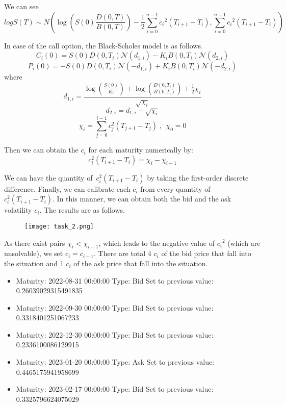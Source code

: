 We can see
\[log S(T) \sim N \left(\log \left( S(0)\frac{D(0,T)}{B(0,T)}\right)-\frac{1}{2}\sum_{i=0}^{n-1} {c_i}^2(T_{i+1}-T_{i}),\sum_{i=0}^{n-1} {c_i}^2(T_{i+1}-T_{i})\right)\]

In case of the call option, the Black-Scholes model is as follows.
\[C_i(0)=S(0)D(0,T_i)\mathcal{N}(d_{1,i})-K_iB(0,T_i)\mathcal{N}(d_{2,i})\]
\[P_i(0)=-S(0)D(0,T_i)\mathcal{N}(-d_{1,i})+K_iB(0,T_i)\mathcal{N}(-d_{2,i})\]
\vspace{1ex}
where \[ d_{1,i}=\frac{\log(\frac{S(0)}{K_i})+\log(\frac{D(0,T_i)}{B(0,T_i)})+\frac{1}{2}\chi_i}{\sqrt{\chi_i}}
\]
\[d_{2,i}=d_{1,i}-\sqrt{\chi_i}\]
\[\chi_i=\sum_{j=0}^{i-1}c_j^2(T_{j+1}-T_{j}) \;\text{, }\; \chi_0=0\]

Then we can obtain the \(c_i\) for each maturity numerically by:
\[c_i^2(T_{i+1}-T_{i})=\chi_i-\chi_{i-1}\]

We can have the quantity of\
\(c_i^2(T_{i+1}-T_{i})\) by taking the first-order discrete difference.
Finally, we can calibrate each \(c_i\) from every quantity of
\(c_i^2(T_{i+1}-T_{i})\). In this manner, we can obtain both the bid and the ask volatility \(c_i\).
\vspace{1ex}
The results are as follows.
\begin{figure}[h]
    \centering
    \texttt{[image: task\_2.png]}
\end{figure}

As there exist pairs \(\chi_i<\chi_{i-1}\), which leads to the negative value of \({c_i}^2\) (which are unsolvable), we set \(c_i=c_{i-1}\). There are total 4 \(c_i\) of the bid price that fall into the situation and 1 \(c_i\) of the ask price that fall into the situation.

\begin{itemize}
    \item Maturity: 2022-08-31 00:00:00 Type: Bid Set to previous value:  0.26039029315491835
    \item Maturity: 2022-09-30 00:00:00 Type: Bid Set to previous value:  0.3318401251067233
    \item Maturity: 2022-12-30 00:00:00 Type: Bid Set to previous value:  0.2336100086129915
    \item Maturity: 2023-01-20 00:00:00 Type: Ask Set to previous value:  0.4465175941958699
    \item Maturity: 2023-02-17 00:00:00 Type: Bid Set to previous value:  0.3325796624075029
\end{itemize}

